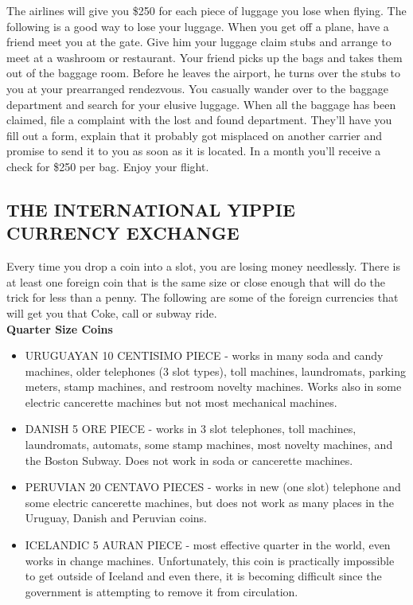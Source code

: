 \documentclass[11pt,twoside,a4paper]{book}
\begin{document}
The airlines will give you \$250 for each piece of luggage you lose when flying. The following is a good way to lose your luggage. When you get off a plane, have a friend meet you at the gate. Give him your luggage claim stubs and arrange to meet at a washroom or restaurant. Your friend picks up the bags and takes them out of the baggage room. Before he leaves the airport, he turns over the stubs to you at your prearranged rendezvous. You casually wander over to the baggage department and search for your elusive luggage. When all the baggage has been claimed, file a complaint with the lost and found department. They'll have you fill out a form, explain that it probably got misplaced on another carrier and promise to send it to you as soon as it is located. In a month you'll receive a check for \$250 per bag. Enjoy your flight.

\subsection{THE INTERNATIONAL YIPPIE CURRENCY EXCHANGE}

Every time you drop a coin into a slot, you are losing money needlessly. There is at least one foreign coin that is the same size or close enough that will do the trick for less than a penny. The following are some of the foreign currencies that will get you that Coke, call or subway ride.~\\

\textbf{Quarter Size Coins}
\begin{itemize}
	\item URUGUAYAN 10 CENTISIMO PIECE         
	- works in many soda and candy machines, older telephones (3 slot types), toll machines, laundromats, parking meters, stamp machines, and restroom novelty machines. Works also in some electric cancerette machines but not most mechanical machines. 
	\item DANISH 5 ORE PIECE         
	- works in 3 slot telephones, toll machines, laundromats, automats, some stamp machines, most novelty machines, and the Boston Subway. Does not work in soda or cancerette machines.     
	\item PERUVIAN 20 CENTAVO PIECES        
	- works in new (one slot) telephone and some electric cancerette machines, but does not work as many places in the Uruguay, Danish and Peruvian coins.     
	\item ICELANDIC 5 AURAN PIECE         
	- most effective quarter in the world, even works in change machines. Unfortunately, this coin is practically impossible to get outside of Iceland and even there, it is becoming difficult since the government is attempting to remove it from circulation.    
\end{itemize}
\end{document}
